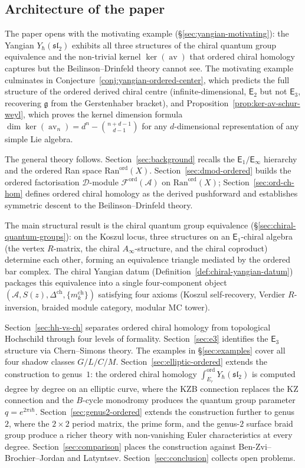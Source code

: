 \documentclass[11pt,reqno]{amsart}
\theoremstyle{definition}
\theoremstyle{remark}
\newcommand{\cA}{\mathcal{A}}
\newcommand{\cD}{\mathcal{D}}
\newcommand{\cF}{\mathcal{F}}
\newcommand{\Ran}{\mathrm{Ran}}
\newcommand{\Ainf}{A_{\infty}}
\newcommand{\Eone}{\mathsf{E}_{1}}
\newcommand{\Etwo}{\mathsf{E}_{2}}
\newcommand{\Ethree}{\mathsf{E}_{3}}
\newcommand{\Einf}{\mathsf{E}_{\infty}}
\DeclareMathOperator{\av}{av}
\newcommand{\fg}{\mathfrak{g}}
\numberwithin{equation}{section}
\begin{document}
\subsection{Architecture of the paper}

The paper opens with the motivating example
(\S\ref{sec:yangian-motivating}): the Yangian
$Y_\hbar(\mathfrak{sl}_2)$ exhibits all three structures
of the chiral quantum group equivalence and the non-trivial
kernel $\ker(\av)$ that ordered chiral homology captures
but the Beilinson--Drinfeld theory cannot see.
The motivating example culminates in
Conjecture~\ref{conj:yangian-ordered-center}, which
predicts the full structure of the ordered derived
chiral centre (infinite-dimensional, $\Etwo$ but
not $\Ethree$, recovering $\fg$ from the Gerstenhaber
bracket), and Proposition~\ref{prop:ker-av-schur-weyl},
which proves the kernel dimension formula
$\dim\ker(\av_n) = d^n - \binom{n+d-1}{d-1}$
for any $d$-dimensional representation of any simple
Lie algebra.

The general theory follows.
Section~\ref{sec:background} recalls the $\Eone/\Einf$
hierarchy and the ordered Ran space
$\Ran^{\mathrm{ord}}(X)$.
Section~\ref{sec:dmod-ordered} builds the ordered
factorisation $\cD$-module
$\cF^{\mathrm{ord}}(\cA)$ on $\Ran^{\mathrm{ord}}(X)$;
Section~\ref{sec:ord-ch-hom} defines ordered chiral
homology as the derived pushforward and establishes
symmetric descent to the Beilinson--Drinfeld theory.

The main structural result is the chiral quantum group
equivalence (\S\ref{sec:chiral-quantum-groups}): on the
Koszul locus, three structures on an $\Eone$-chiral algebra
(the vertex $R$-matrix, the chiral $\Ainf$-structure,
and the chiral coproduct) determine each other, forming
an equivalence triangle mediated by the ordered bar complex.
The chiral Yangian datum
(Definition~\ref{def:chiral-yangian-datum}) packages
this equivalence into a single four-component object
$(\cA, S(z), \Delta^{\mathrm{ch}}, \{m_k^{\mathrm{ch}}\})$
satisfying four axioms (Koszul self-recovery, Verdier
$R$-inversion, braided module category, modular MC tower).

Section~\ref{sec:hh-vs-ch} separates ordered chiral
homology from topological Hochschild through four levels
of formality.
Section~\ref{sec:e3} identifies the $\Ethree$ structure
via Chern--Simons theory.
The examples in \S\ref{sec:examples}
cover all four shadow classes $G/L/C/M$.
Section~\ref{sec:elliptic-ordered} extends the construction
to genus~$1$: the ordered chiral homology
$\int_{E_\tau}^{\mathrm{ord}} Y_\hbar(\mathfrak{sl}_2)$
is computed degree by degree on an elliptic curve, where
the KZB connection replaces the KZ connection and the
$B$-cycle monodromy produces the quantum group parameter
$q = e^{2\pi i \hbar}$.
Section~\ref{sec:genus2-ordered} extends the construction
further to genus~$2$, where the $2 \times 2$ period matrix,
the prime form, and the genus-$2$ surface braid group
produce a richer theory with non-vanishing Euler
characteristics at every degree.
Section~\ref{sec:comparison} places the construction
against Ben-Zvi--Brochier--Jordan and Latyntsev.
Section~\ref{sec:conclusion} collects open problems.
\end{document}
